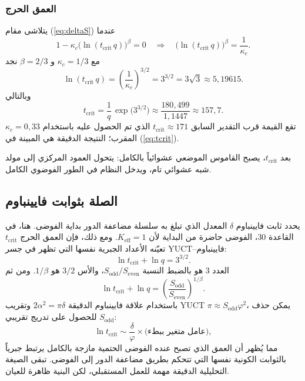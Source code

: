 \documentclass[12pt,a4paper]{article}
\begin{document}
	\subsubsection*{العمق الحرج}
	يتلاشى مقام (\ref{eq:deltaS}) عندما
	\[
	1 - \kappa_c\bigl(\ln(t_{\mathrm{crit}}\,q)\bigr)^{\beta} = 0
	\quad\Longrightarrow\quad
	\bigl(\ln(t_{\mathrm{crit}}\,q)\bigr)^{\beta} = \frac{1}{\kappa_c}.
	\]
	مع \(\kappa_c = 1/3\) و \(\beta = 2/3\) نجد
	\begin{equation}
		\ln(t_{\mathrm{crit}}\,q) = \left(\frac{1}{\kappa_c}\right)^{3/2}
		= 3^{3/2} = 3\sqrt{3} \approx 5{,}19615.
		\label{eq:crit-ln}
	\end{equation}
	وبالتالي
	\begin{equation}
		\boxed{t_{\mathrm{crit}} = \frac{1}{q}\,
			\exp\!\bigl(3^{3/2}\bigr)
			\approx \frac{180{,}499}{1{,}1447} \approx 157{,}7}.
		\label{eq:tcrit}
	\end{equation}
	تقع القيمة قرب التقدير السابق \(t_{\mathrm{crit}}\approx171\) الذي تم الحصول عليه باستخدام \(\kappa_c = 0{,}33\) المقرب؛ النتيجة الدقيقة هي المبينة في (\ref{eq:tcrit}).
	
	بعد \(t_{\mathrm{crit}}\)، يصبح القاموس الموضعي عشوائياً بالكامل: يتحول العمود المركزي إلى مولد شبه عشوائي تام، ويدخل النظام في الطور الفوضوي الكامل.
	
	\subsection{الصلة بثوابت فايينباوم}
	\label{subsec:feigenbaum-link}
	
	يحدد ثابت فايينباوم \(\delta\) المعدل الذي تبلغ به سلسلة مضاعفة الدور بداية الفوضى. هنا، في القاعدة 30، الفوضى حاضرة من البداية لأن \(K_{\mathrm{eff}}=1\). ومع ذلك، فإن العمق الحرج \(t_{\mathrm{crit}}\) تعيّنه الأعداد الجبرية نفسها التي تظهر في جسر YUCT–فايينباوم:
	\[
	\ln t_{\mathrm{crit}} + \ln q = 3^{3/2}.
	\]
	العدد \(3\) هو بالضبط النسبة \(S_{\mathrm{odd}}/S_{\mathrm{even}}\)، والأس \(3/2\) هو \(1/\beta\). ومن ثم
	\[
	\ln t_{\mathrm{crit}} + \ln q =
	\left(\frac{S_{\mathrm{odd}}}{S_{\mathrm{even}}}\right)^{\!1/\beta}.
	\]
	باستخدام علاقة فايينباوم الدقيقة \(2\alpha^{2} = \pi\delta\) وتقريب YUCT \(\pi \approx S_{\mathrm{odd}}\varphi^{2}\)، يمكن حذف \(S_{\mathrm{odd}}\) للحصول على تدريج تقريبي:
	\[
	\ln t_{\mathrm{crit}} \sim \frac{\delta}{\varphi} \times
	\bigl(\text{عامل متغير ببطء}\bigr),
	\]
	مما يُظهر أن العمق الذي تصبح عنده الفوضى الحتمية مازجة بالكامل يرتبط جبرياً بالثوابت الكونية نفسها التي تتحكم بطريق مضاعفة الدور إلى الفوضى. تبقى الصيغة التحليلية الدقيقة مهمة للعمل المستقبلي، لكن البنية ظاهرة للعيان.
	
\end{document}
